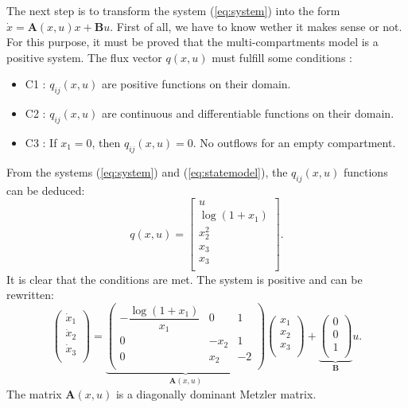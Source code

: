 The next step is to transform the system (\ref{eq:system}) into the form $\dot{x}=\mathbf{A}(x,u)x+\mathbf{B}u$. First of all, we have to know wether it makes sense or not. For this purpose, it must be proved that the multi-compartments model is a positive system. The flux vector $q(x,u)$ must fulfill some conditions :
\begin{itemize}
\item C1 : $q_{ij}(x,u)$ are positive functions on their domain.
\item C2 : $q_{ij}(x,u)$ are continuous and differentiable functions on their domain.
\item C3 : If $x_1 =0$, then $q_{ij}(x,u)=0$. No outflows for an empty compartment.
\end{itemize}

From the systems (\ref{eq:system}) and (\ref{eq:statemodel}), the $q_{ij}(x,u)$ functions can be deduced:
\begin{equation}
 q(x,u)=
 \begin{bmatrix}
 u\\
 \log(1+x_1)\\
x_2^2\\
x_3\\
x_3\\
 \end{bmatrix}.
\label{eq:qij}
\end{equation}
It is clear that the conditions are met. The system is positive and can be rewritten:
\begin{equation}
\begin{pmatrix}
\dot{x}_1\\
\dot{x}_2\\
\dot{x}_3\\
\end{pmatrix}=
\underbrace{
\begin{pmatrix}
-\dfrac{\log(1+x_1)}{x_1} & 0 & 1\\
0 & -x_2 & 1\\
0 & x_2 & -2\\
\end{pmatrix}}_{\mathbf{A}(x,u)}
\begin{pmatrix}
x_1\\
x_2\\
x_3\\
\end{pmatrix}+\underbrace{
\begin{pmatrix}
0\\
0\\
1\\
\end{pmatrix}}_{\mathbf{B}}u.
\label{eq:Ax}
\end{equation}
The matrix $\mathbf{A}(x,u)$ is a diagonally dominant Metzler matrix.

